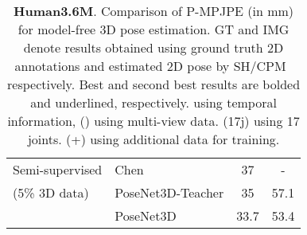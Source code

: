 \documentclass[10pt,twocolumn,letterpaper]{article}
\begin{document}
\begin{table}[tb!]
\begin{adjustbox}{max width=0.99\textwidth}
\begin{tabular}{llcc}
			\midrule
		Semi-supervised  & Chen~\etal~\cite{chingCVPR2019}  & 37 & - \\
		(5\% 3D data) & PoseNet3D-Teacher & 35 & 57.1 \\
		&PoseNet3D  & 33.7 &  53.4\\ 		

		

		\bottomrule
	\end{tabular}
	\end{adjustbox}
	\caption{\textbf{Human3.6M}. Comparison of P-MPJPE (in mm) for model-free 3D pose estimation. GT and IMG denote results obtained using ground truth 2D annotations and estimated 2D pose by SH/CPM~\cite{stacked-hourglass,cpm} respectively. Best and second best results are bolded and underlined, respectively.  using temporal information, () using multi-view data. (17j) using 17 joints. (+) using additional data for training.}
	\vspace{-3ex}
	\label{table:h36_teacher}
\end{table}
\end{document}
